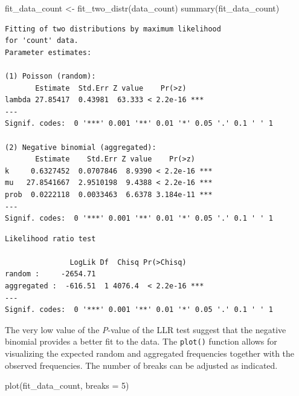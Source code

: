 \documentclass[
  letterpaper,
  DIV=11,
  numbers=noendperiod]{scrreprt}
\newenvironment{Shaded}{\begin{snugshade}}{\end{snugshade}}
\newcommand{\AttributeTok}[1]{\textcolor[rgb]{0.40,0.45,0.13}{#1}}
\newcommand{\DecValTok}[1]{\textcolor[rgb]{0.68,0.00,0.00}{#1}}
\newcommand{\FunctionTok}[1]{\textcolor[rgb]{0.28,0.35,0.67}{#1}}
\newcommand{\NormalTok}[1]{\textcolor[rgb]{0.00,0.23,0.31}{#1}}
\newcommand{\OtherTok}[1]{\textcolor[rgb]{0.00,0.23,0.31}{#1}}
\newcommand{\SpecialCharTok}[1]{\textcolor[rgb]{0.37,0.37,0.37}{#1}}
\begin{document}
\begin{Shaded}
\begin{Highlighting}[]
\NormalTok{fit\_data\_count }\OtherTok{\textless{}{-}} \FunctionTok{fit\_two\_distr}\NormalTok{(data\_count)}
\FunctionTok{summary}\NormalTok{(fit\_data\_count)}
\end{Highlighting}
\end{Shaded}

\begin{verbatim}
Fitting of two distributions by maximum likelihood
for 'count' data.
Parameter estimates:

(1) Poisson (random):
       Estimate  Std.Err Z value    Pr(>z)    
lambda 27.85417  0.43981  63.333 < 2.2e-16 ***
---
Signif. codes:  0 '***' 0.001 '**' 0.01 '*' 0.05 '.' 0.1 ' ' 1

(2) Negative binomial (aggregated):
       Estimate    Std.Err Z value    Pr(>z)    
k     0.6327452  0.0707846  8.9390 < 2.2e-16 ***
mu   27.8541667  2.9510198  9.4388 < 2.2e-16 ***
prob  0.0222118  0.0033463  6.6378 3.184e-11 ***
---
Signif. codes:  0 '***' 0.001 '**' 0.01 '*' 0.05 '.' 0.1 ' ' 1
\end{verbatim}

\begin{Shaded}
\end{Shaded}

\begin{verbatim}
Likelihood ratio test

               LogLik Df  Chisq Pr(>Chisq)    
random :     -2654.71                         
aggregated :  -616.51  1 4076.4  < 2.2e-16 ***
---
Signif. codes:  0 '***' 0.001 '**' 0.01 '*' 0.05 '.' 0.1 ' ' 1
\end{verbatim}

The very low value of the \emph{P}-value of the LLR test suggest that
the negative binomial provides a better fit to the data. The
\texttt{plot()} function allows for visualizing the expected random and
aggregated frequencies together with the observed frequencies. The
number of breaks can be adjusted as indicated.

\begin{Shaded}
\begin{Highlighting}[]
\FunctionTok{plot}\NormalTok{(fit\_data\_count, }\AttributeTok{breaks =} \DecValTok{5}\NormalTok{) }
\end{Highlighting}
\end{Shaded}
\end{document}
